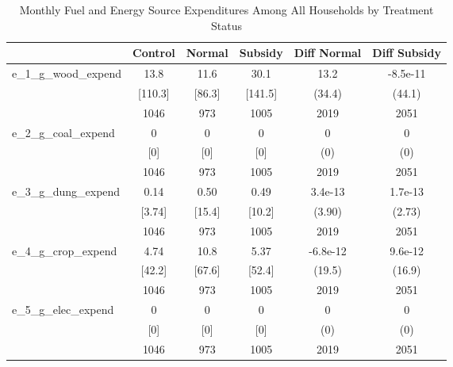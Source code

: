 \begin{table}[htbp]\centering
\def\sym#1{\ifmmode^{#1}\else\(^{#1}\)\fi}
\caption{Monthly Fuel and Energy Source Expenditures Among All Households by Treatment Status \label{tab:"balance"}}
\begin{tabular*}{0.9\hsize}{@{\hskip\tabcolsep\extracolsep\fill}l*{1}{ccccc}}
\toprule
                                &  Control&   Normal&  Subsidy&Diff Normal         &Diff Subsidy         \\
\midrule
e\_1\_g\_wood\_expend               &     13.8&     11.6&     30.1&     13.2         & -8.5e-11         \\
                                &  [110.3]&   [86.3]&  [141.5]&   (34.4)         &   (44.1)         \\
                                &     1046&      973&     1005&     2019         &     2051         \\
e\_2\_g\_coal\_expend               &        0&        0&        0&        0         &        0         \\
                                &      [0]&      [0]&      [0]&      (0)         &      (0)         \\
                                &     1046&      973&     1005&     2019         &     2051         \\
e\_3\_g\_dung\_expend               &     0.14&     0.50&     0.49&  3.4e-13         &  1.7e-13         \\
                                &   [3.74]&   [15.4]&   [10.2]&   (3.90)         &   (2.73)         \\
                                &     1046&      973&     1005&     2019         &     2051         \\
e\_4\_g\_crop\_expend               &     4.74&     10.8&     5.37& -6.8e-12         &  9.6e-12         \\
                                &   [42.2]&   [67.6]&   [52.4]&   (19.5)         &   (16.9)         \\
                                &     1046&      973&     1005&     2019         &     2051         \\
e\_5\_g\_elec\_expend               &        0&        0&        0&        0         &        0         \\
                                &      [0]&      [0]&      [0]&      (0)         &      (0)         \\
                                &     1046&      973&     1005&     2019         &     2051         \\

\end{tabular*}
\end{table}
